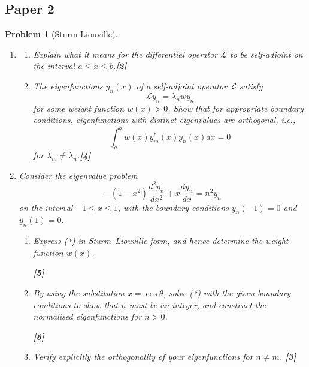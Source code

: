 \documentclass[a4paper]{article}
\theoremstyle{new}
\newtheorem{qns}{Problem}[section]
\begin{document}
\subsection{Paper 2}
\begin{qns}[Sturm-Liouville]\leavevmode
\begin{enumerate}[label=(\alph*)]
\item 
\begin{enumerate}[label=(\roman*)]
\item Explain what it means for the differential operator $\mathcal{L}$ to be self-adjoint on the interval
$a\leq x\leq b$.\hfill \textbf{[2]}
\item The eigenfunctions $y_n(x)$ of a self-adjoint operator $\mathcal{L}$ satisfy
$$\mathcal{L}y_n=\lambda_nwy_n$$
for some weight function $w(x) > 0$. Show that for appropriate boundary conditions, eigenfunctions with distinct eigenvalues are orthogonal, i.e.,
$$\int_a^bw(x)y_m^*(x)y_n(x)dx=0$$
for $\lambda_m\neq\lambda_n$.\hfill \textbf{[4]}
\end{enumerate}
\item Consider the eigenvalue problem
\begin{equation}
-(1-x^2)\frac{d^2y_n}{dx^2}+x\frac{dy_n}{dx}=n^2y_n\tag{*}
\end{equation}
on the interval $-1\leq x\leq 1$, with the boundary conditions $y_n(−1) = 0$ and $y_n(1) = 0$.
\begin{enumerate}[label=(\roman*)]
\item  Express (*) in Sturm–Liouville form, and hence determine the weight function $w(x)$. 

\hfill \textbf{[5]}
\item By using the substitution $x=\cos\theta$, solve (*) with the given boundary conditions to show that $n$ must be an integer, and construct the normalised eigenfunctions for $n > 0$. 

\hfill \textbf{[6]}
\item Verify explicitly the orthogonality of your eigenfunctions for $n\neq m$. \hfill \textbf{[3]}
\end{enumerate}
\end{enumerate}
\end{qns}
\end{document}
